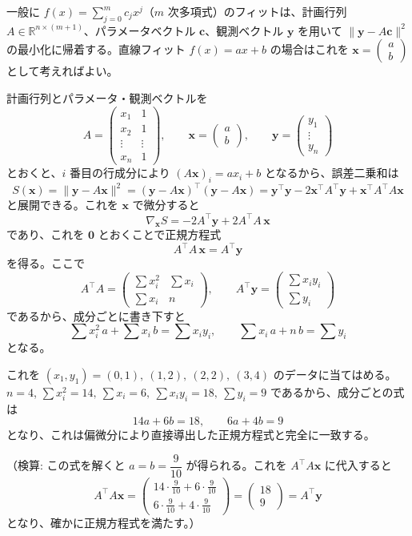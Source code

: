 
一般に $f(x) = \sum_{j=0}^{m} c_j x^j$（$m$ 次多項式）のフィットは、計画行列 $A \in \mathbb{R}^{n\times(m+1)}$、パラメータベクトル $\bm{c}$、観測ベクトル $\bm{y}$ を用いて $\|\bm{y} - A\bm{c}\|^2$ の最小化に帰着する。直線フィット $f(x)=ax+b$ の場合はこれを $\bm{x} = \begin{pmatrix} a \\ b \end{pmatrix}$ として考えればよい。

計画行列とパラメータ・観測ベクトルを
\[
A = \begin{pmatrix} x_1 & 1 \\ x_2 & 1 \\ \vdots & \vdots \\ x_n & 1 \end{pmatrix}, \qquad
\bm{x} = \begin{pmatrix} a \\ b \end{pmatrix}, \qquad
\bm{y} = \begin{pmatrix} y_1 \\ \vdots \\ y_n \end{pmatrix}
\]
とおくと、$i$ 番目の行成分により $(A\bm{x})_i = ax_i + b$ となるから、誤差二乗和は
\[
S(\bm{x}) = \|\bm{y} - A\bm{x}\|^2 = (\bm{y}-A\bm{x})^{\top}(\bm{y}-A\bm{x})
= \bm{y}^{\top}\bm{y} - 2\bm{x}^{\top}A^{\top}\bm{y} + \bm{x}^{\top}A^{\top}A\bm{x}
\]
と展開できる。これを $\bm{x}$ で微分すると
\[
\nabla_{\bm{x}} S = -2A^{\top}\bm{y} + 2A^{\top}A\,\bm{x}
\]
であり、これを $\bm{0}$ とおくことで正規方程式
\[
\boxed{\; A^{\top}A\,\bm{x} = A^{\top}\bm{y} \;}
\]
を得る。ここで
\[
A^{\top}A = \begin{pmatrix} \sum x_i^2 & \sum x_i \\ \sum x_i & n \end{pmatrix}, \qquad
A^{\top}\bm{y} = \begin{pmatrix} \sum x_i y_i \\ \sum y_i \end{pmatrix}
\]
であるから、成分ごとに書き下すと
\[
\sum x_i^2\, a + \sum x_i\, b = \sum x_i y_i, \qquad \sum x_i\, a + n\, b = \sum y_i
\]
となる。

これを $(x_1,y_1)=(0,1),\ (1,2),\ (2,2),\ (3,4)$ のデータに当てはめる。$n=4$, $\sum x_i^2=14,\ \sum x_i=6,\ \sum x_iy_i=18,\ \sum y_i=9$ であるから、成分ごとの式は
\[
14a+6b=18, \qquad 6a+4b=9
\]
となり、これは偏微分により直接導出した正規方程式と完全に一致する。

（検算: この式を解くと $a=b=\dfrac{9}{10}$ が得られる。これを $A^{\top}A\bm{x}$ に代入すると
\[
A^{\top}A\bm{x} = \begin{pmatrix}14\cdot\frac{9}{10}+6\cdot\frac{9}{10}\\ 6\cdot\frac{9}{10}+4\cdot\frac{9}{10}\end{pmatrix} = \begin{pmatrix}18\\9\end{pmatrix} = A^{\top}\bm{y}
\]
となり、確かに正規方程式を満たす。）
